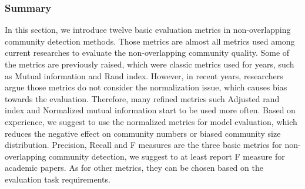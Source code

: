 \subsubsection{Summary}
In this section, we introduce twelve basic evaluation metrics in non-overlapping community detection methods.  Those metrics are almost all metrics used among current researches to evaluate the non-overlapping community quality. Some of the metrics are previously raised, which were classic metrics used for years, such as Mutual information and Rand index. However, in recent years, researchers argue those metrics do not consider the normalization issue, which causes bias towards the evaluation. Therefore, many refined metrics such Adjusted rand index and Normalized mutual information start to be used more often. Based on experience, we suggest to use the normalized metrics for model evaluation, which reduces the negative effect on community numbers or biased  community size distribution. Precision, Recall and F measures are the three basic metrics for non-overlapping community detection, we suggest to at least report F measure for academic papers. As for other metrics, they can be chosen based on the evaluation task requirements.

